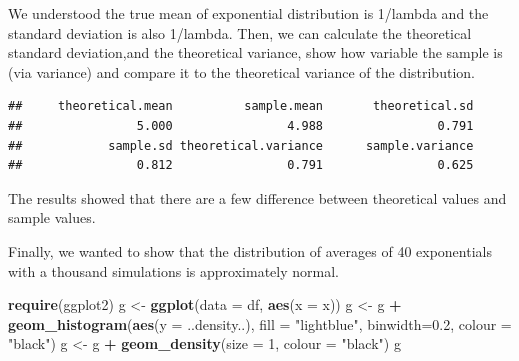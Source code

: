 \documentclass[
  landscape]{article}
\newenvironment{Shaded}{\begin{snugshade}}{\end{snugshade}}
\newcommand{\DataTypeTok}[1]{\textcolor[rgb]{0.13,0.29,0.53}{#1}}
\newcommand{\DecValTok}[1]{\textcolor[rgb]{0.00,0.00,0.81}{#1}}
\newcommand{\FloatTok}[1]{\textcolor[rgb]{0.00,0.00,0.81}{#1}}
\newcommand{\KeywordTok}[1]{\textcolor[rgb]{0.13,0.29,0.53}{\textbf{#1}}}
\newcommand{\NormalTok}[1]{#1}
\newcommand{\OperatorTok}[1]{\textcolor[rgb]{0.81,0.36,0.00}{\textbf{#1}}}
\newcommand{\StringTok}[1]{\textcolor[rgb]{0.31,0.60,0.02}{#1}}
\begin{document}
We understood the true mean of exponential distribution is 1/lambda and
the standard deviation is also 1/lambda. Then, we can calculate the
theoretical standard deviation,and the theoretical variance, show how
variable the sample is (via variance) and compare it to the theoretical
variance of the distribution.

\begin{Shaded}
\end{Shaded}

\begin{verbatim}
##     theoretical.mean          sample.mean       theoretical.sd 
##                5.000                4.988                0.791 
##            sample.sd theoretical.variance      sample.variance 
##                0.812                0.791                0.625
\end{verbatim}

The results showed that there are a few difference between theoretical
values and sample values.

Finally, we wanted to show that the distribution of averages of 40
exponentials with a thousand simulations is approximately normal.

\begin{Shaded}
\begin{Highlighting}[]
\KeywordTok{require}\NormalTok{(ggplot2)}
\NormalTok{g <-}\StringTok{ }\KeywordTok{ggplot}\NormalTok{(}\DataTypeTok{data =}\NormalTok{ df, }\KeywordTok{aes}\NormalTok{(}\DataTypeTok{x =}\NormalTok{ x)) }
\NormalTok{g <-}\StringTok{ }\NormalTok{g }\OperatorTok{+}\StringTok{ }\KeywordTok{geom_histogram}\NormalTok{(}\KeywordTok{aes}\NormalTok{(}\DataTypeTok{y =}\NormalTok{ ..density..), }\DataTypeTok{fill =} \StringTok{"lightblue"}\NormalTok{, }\DataTypeTok{binwidth=}\FloatTok{0.2}\NormalTok{, }\DataTypeTok{colour =} \StringTok{"black"}\NormalTok{)}
\NormalTok{g <-}\StringTok{ }\NormalTok{g }\OperatorTok{+}\StringTok{ }\KeywordTok{geom_density}\NormalTok{(}\DataTypeTok{size =} \DecValTok{1}\NormalTok{, }\DataTypeTok{colour =} \StringTok{"black"}\NormalTok{)}
\NormalTok{g}
\end{Highlighting}
\end{Shaded}
\end{document}
